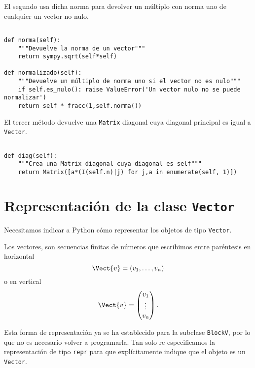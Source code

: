 \documentclass[11pt]{report}
\begin{document}
El segundo usa dicha norma para devolver un múltiplo con norma uno de
cualquier un vector no nulo.

\begin{verbatim}

def norma(self):
    """Devuelve la norma de un vector"""
    return sympy.sqrt(self*self)
                                                               
def normalizado(self):
    """Devuelve un múltiplo de norma uno si el vector no es nulo"""
    if self.es_nulo(): raise ValueError('Un vector nulo no se puede normalizar')
    return self * fracc(1,self.norma())

\end{verbatim}

El tercer método devuelve una \texttt{Matrix} diagonal cuya diagonal
principal es igual a \texttt{Vector}.

\begin{verbatim}

def diag(self):
    """Crea una Matrix diagonal cuya diagonal es self"""
    return Matrix([a*(I(self.n)|j) for j,a in enumerate(self, 1)])

\end{verbatim}

\section{Representación de la clase \texttt{Vector}}
\label{sec:orgc8e8eda}

Necesitamos indicar a Python cómo representar los objetos de tipo
\texttt{Vector}.

Los vectores, son secuencias finitas de números que escribimos entre
paréntesis en horizontal
\begin{displaymath}
  \Vect{v}=(v_1,\ldots,v_n)
\end{displaymath}
o en vertical
\begin{displaymath}
  \Vect{v}=\begin{pmatrix}v_1\\ \vdots \\ v_n\end{pmatrix}.
\end{displaymath}

Esta forma de representación ya se ha establecido para la subclase
\texttt{BlockV}, por lo que no es necesario volver a programarla. Tan solo
re-especificamos la representación de tipo \texttt{repr} para que
explícitamente indique que el objeto es un \texttt{Vector}.
\end{document}
